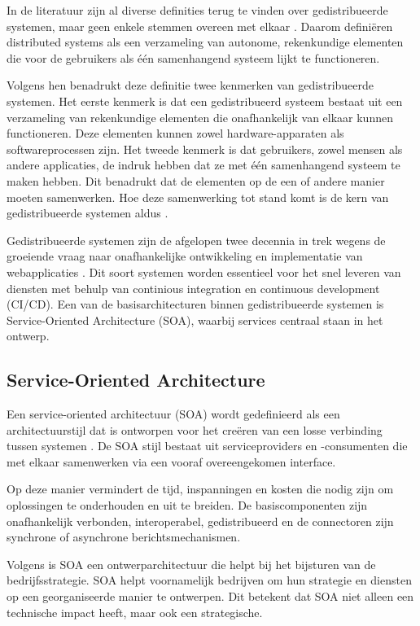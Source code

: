 In de literatuur zijn al diverse definities terug te vinden over gedistribueerde systemen, maar geen enkele stemmen overeen met elkaar \autocite{Steen2018}. Daarom definiëren \textcite{Steen2018} distributed systems als een verzameling van autonome, rekenkundige elementen die voor de gebruikers als één samenhangend systeem lijkt te functioneren.

Volgens hen benadrukt deze definitie twee kenmerken van gedistribueerde systemen. Het eerste kenmerk is dat een gedistribueerd systeem bestaat uit een verzameling van rekenkundige elementen die onafhankelijk van elkaar kunnen functioneren. Deze elementen kunnen zowel hardware-apparaten als softwareprocessen zijn. Het tweede kenmerk is dat gebruikers, zowel mensen als andere applicaties, de indruk hebben dat ze met één samenhangend systeem te maken hebben. Dit benadrukt dat de elementen op de een of andere manier moeten samenwerken. Hoe deze samenwerking tot stand komt is de kern van gedistribueerde systemen aldus \textcite{Steen2018}.

Gedistribueerde systemen zijn de afgelopen twee decennia in trek wegens de groeiende vraag naar onafhankelijke ontwikkeling en implementatie van webapplicaties \autocite{Raj2021}. Dit soort systemen worden essentieel voor het snel leveren van diensten met behulp van continious integration en continuous development (CI/CD). Een van de basisarchitecturen binnen gedistribueerde systemen is Service-Oriented Architecture (SOA), waarbij services centraal staan in het ontwerp.

\subsection{Service-Oriented Architecture}
\label{sec:SOA_architectuur}

Een service-oriented architectuur (SOA) wordt gedefinieerd als een architectuurstijl dat is ontworpen voor het creëren van een losse verbinding tussen systemen \autocite{Rojas2021}. De SOA stijl bestaat uit serviceproviders en -consumenten die met elkaar samenwerken via een vooraf overeengekomen interface. 

Op deze manier vermindert de tijd, inspanningen en kosten die nodig zijn om oplossingen te onderhouden en uit te breiden. De basiscomponenten zijn onafhankelijk verbonden, interoperabel, gedistribueerd en de connectoren zijn synchrone of asynchrone berichtsmechanismen.\newline

Volgens \textcite{Muhardany2020} is SOA een ontwerparchitectuur die helpt bij het bijsturen van de bedrijfsstrategie. SOA helpt voornamelijk bedrijven om hun strategie en diensten op een georganiseerde manier te ontwerpen. Dit betekent dat SOA niet alleen een technische impact heeft, maar ook een strategische.

